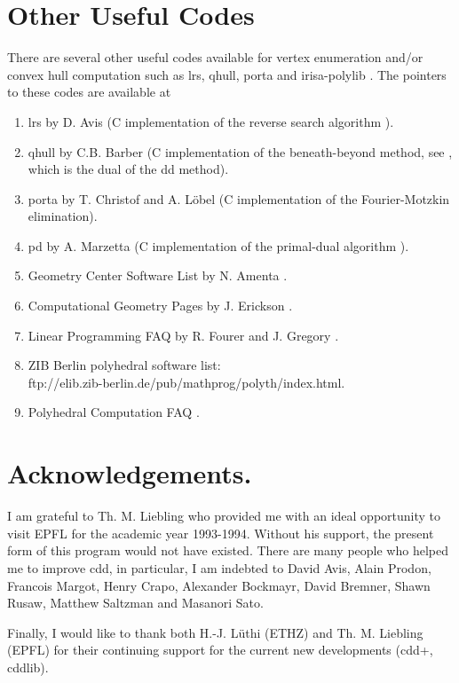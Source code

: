\documentclass[11pt]{article}
\newcommand {\0} {{\bf 0}}
\begin{document}
\section{Other Useful Codes}  \label{CODES}
There are several other useful codes available for vertex enumeration and/or
convex hull computation  such as lrs, qhull, porta and irisa-polylib 
\cite{w-ldpo-93b}.
The pointers to these codes are available at
\begin{enumerate}
\item lrs by D. Avis \cite{a-uglrs-97} (C implementation of the reverse search algorithm 
\cite{af-pachv-92}). 

\item qhull by C.B. Barber \cite{bdh-qach-95} (C implementation of
the beneath-beyond method, see \cite{e-acg-87,m-cg-94},
which is the dual of the dd method). 

\item porta by T. Christof and A. L{\"o}bel \cite{cl-porta-97} (C implementation
of the Fourier-Motzkin elimination).

\item pd by A. Marzetta \cite{m-pdcip-97} (C implementation of the primal-dual algorithm 
\cite{bfm-pdmvf-97}). 

 \item Geometry Center Software List by N. Amenta \cite{a-dcg}.

 \item Computational Geometry Pages by J. Erickson \cite{e-cgp}.

 \item Linear Programming FAQ by R. Fourer and J. Gregory \cite{fg-lpfaq-97}.

 \item ZIB Berlin polyhedral software list:\\
{ftp://elib.zib-berlin.de/pub/mathprog/polyth/index.html}.

\item Polyhedral Computation FAQ \cite{f-pcfaq-98}.
\end{enumerate}


\section*{Acknowledgements.} 
I am  grateful to Th. M. Liebling who
provided me with an ideal opportunity to visit EPFL
for the academic year 1993-1994.  Without his 
support, the present form of this program would not have existed.
There are many people who helped me to improve cdd,  in particular,
I am indebted to David Avis, Alain Prodon,  Francois Margot, Henry Crapo,
Alexander Bockmayr, David Bremner, Shawn Rusaw, Matthew Saltzman 
and Masanori Sato. 

Finally, I would like to thank both H.-J. L\"uthi (ETHZ)
 and Th. M. Liebling (EPFL) for their continuing support for 
the current new developments (cdd+, cddlib).  




\end{document}
